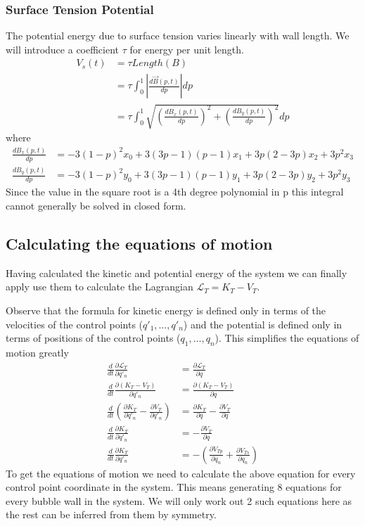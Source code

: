 \documentclass{article}
\begin{document}
\subsubsection{Surface Tension Potential}
The potential energy due to surface tension varies linearly with wall length. We
will introduce a coefficient $\tau$ for energy per unit length.
\begin{align*}
V_s(t)&=\tau Length(B)\\
&=\tau \int_0^1 \left|\frac{d \vec{B}(p,t)}{dp}\right| dp\\
&=\tau \int_0^1 \sqrt{\left(\frac{d B_x(p,t)}{dp}\right)^2+\left(\frac{d
B_y(p,t)}{dp}\right)^2} dp
\end{align*}
where
\begin{align*}
\frac{d B_x(p,t)}{dp}&= -3(1-p)^2x_0 +3(3p-1) (p-1)x_1+3p(2-3p)x_2 +3p^2x_3\\
\frac{d B_y(p,t)}{dp}&= -3(1-p)^2y_0 +3(3p-1) (p-1)y_1+3p(2-3p)y_2 +3p^2y_3
\end{align*}
Since the value in the square root is a 4th degree polynomial in p this
integral cannot generally be solved in closed form.
\subsection{Calculating the equations of motion}
Having calculated the kinetic and potential energy of the system we can finally
apply use them to calculate the Lagrangian $\mathcal{L}_T=K_T-V_T$.

Observe that the formula for kinetic energy is defined only in terms of
the velocities of the control points ($q'_1,\dots,q'_n$) and the potential is
defined only in terms of positions of the control points ($q_1,\dots,q_n$).
This simplifies the equations of motion greatly
\begin{align*}
\frac{d}{d t}\frac{\partial \mathcal{L}_T}{\partial q'_n} 
&=\frac{\partial \mathcal{L}_T}{\partial q} \\
\frac{d}{d t}\frac{\partial (K_T-V_T)}{\partial q'_n}
&= \frac{\partial (K_T-V_T)}{\partial q} \\
\frac{d}{d t}\left( \frac{\partial K_T}{\partial q'_n} - \frac{\partial
V_T}{\partial q'_n}\right)
&=\frac{\partial K_T}{\partial q}-\frac{\partial V_T}{\partial q} \\
\frac{d}{d t} \frac{\partial K_T}{\partial q'_n}
&=-\frac{\partial V_T}{\partial q}\\
\frac{d}{d t} \frac{\partial K_T}{\partial q'_n}
&= -\left(\frac{\partial V_{Tp}}{\partial q_n}+\frac{\partial V_{Ts}}{\partial
q_n}\right)
\end{align*}
To get the equations of motion we need to calculate the above equation for every
control point coordinate in the system. This means generating 8 equations for
every bubble wall in the system. We will only work out 2 such equations here as
the rest can be inferred from them by symmetry.
\end{document}
